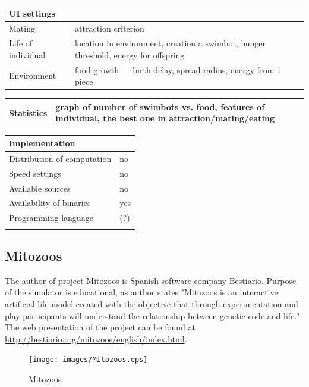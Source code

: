 \documentclass[a4paper,12pt]{report}
\begin{document}
\vspace{10pt}
\begin{tabular}{|p{150pt}|p{220pt}|} \hline \textbf{UI settings}&\\ \hline
Mating&attraction criterion\\ \hline
Life of individual&location in environment, creation a swimbot, hunger threshold, energy for offspring\\ \hline
Environment&food growth --- birth delay, spread radius, energy from 1 piece\\ \hline
\end{tabular} 

\vspace{10pt}
\begin{tabular}{|p{150pt}|p{220pt}|} \hline \textbf{Statistics}&graph of number of swimbots vs. food, features of individual, the best one in attraction/mating/eating\\ \hline
\end{tabular} 

\vspace{10pt}
\begin{tabular}{|p{150pt}|p{220pt}|} \hline \textbf{Implementation}&\\ \hline
Distribution of computation&no\\ \hline
Speed settings&no\\ \hline
Available sources&no\\ \hline
Availability of binaries&yes\\ \hline
Programming language&(?)\\ \hline
&\\ \hline


\end{tabular}

\subsection {Mitozoos}
The author of project Mitozoos is Spanish software company Bestiario. Purpose of the simulator is educational, as author states "Mitozoos is an interactive artificial life model created with the objective that through experimentation and play participants will understand the relationship between genetic code and life." The web presentation of the project can be found at \url{http://bestiario.org/mitozoos/english/index.html}.

\begin{figure}
\begin{center}
  \texttt{[image: images/Mitozoos.eps]}
  \caption{Mitozoos}
  \label{img.Mitozoos}
\end{center}
\end{figure}
\end{document}
